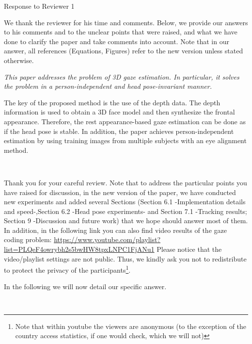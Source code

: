 \newcommand{\rev}[1]{{\noindent {\bf Comment:} {\it #1}}~\\}
\newcommand{\ans}[1]{{\noindent {\bf Response:} #1}~\\}
\newcommand{\td}[1]{{\noindent {\bf TODO:} #1}~\\}



{\LARGE \noindent Response to Reviewer 1}\newline


\noindent We thank the reviewer for his time and comments.
Below, we provide our answers to his comments and to the unclear points that were raised, 
and what we have done to clarify the paper and take comments into account. 
Note that in our answer, all references (Equations, Figures) 
refer to the new version unless stated otherwise. 

\vspace*{4mm}

\rev{This paper addresses the problem of 3D gaze estimation. In particular, it solves the problem in a person-independent and head pose-invariant manner.

The key of the proposed method is the use of the depth data. The depth information is used to obtain a 3D face model and then synthesize the frontal appearance. Therefore, the rest appearance-based gaze estimation can be done as if the head pose is stable. In addition, the paper achieves person-independent estimation by using training images from multiple subjects with an eye alignment method.}

\ans{Thank you for your careful review. 
Note that to address the particular points  you have raised for discussion, in the new version of the paper, 
we have conducted new experiments and added several Sections (Section 6.1 -Implementation details and speed-,Section 6.2 -Head pose experiments- 
and Section 7.1 -Tracking results; Section 9 -Discussion and future work) that we hope should answer most of them. 
In addition, in the following link you can also find video results of the gaze coding problem:
\newline
\newline
\url{https://www.youtube.com/playlist?list=PLQeF4owrybh2s5bwHW8tpxLNPC1FjANu1}
\newline
\newline
Please notice that the video/playlist settings are not public. Thus, we kindly ask you not to redistribute to protect the privacy of the participants\footnote{Note that within youtube the viewers are anonymous (to the exception of the country access statistics, if one would check, which we will not)}.

In the following we will now detail our specific answer.
}

